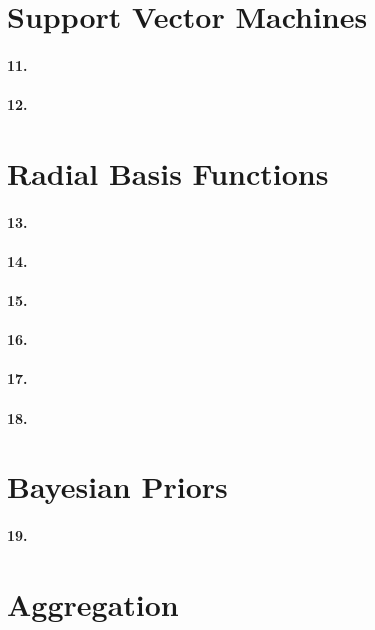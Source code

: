 \documentclass[titlepage]{article}
\begin{document}
\section*{Support Vector Machines}
\paragraph{11.} 
\paragraph{12.} 

\section*{Radial Basis Functions}
\paragraph{13.} 
\paragraph{14.} 
\paragraph{15.} 
\paragraph{16.} 
\paragraph{17.} 
\paragraph{18.} 

\section*{Bayesian Priors}
\paragraph{19.} 

\section*{Aggregation}
\end{document}
